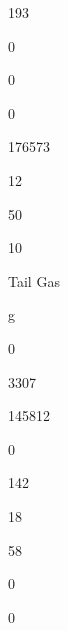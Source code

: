 \documentclass[a4paper,portrait,12pt]{article}
\begin{document}
193





0





0





0





176573





12





50





10





\begin{flushleft}
Tail Gas
\end{flushleft}





\begin{flushleft}
g
\end{flushleft}





0





3307





145812





0





142





18





58





0





0
\end{document}
